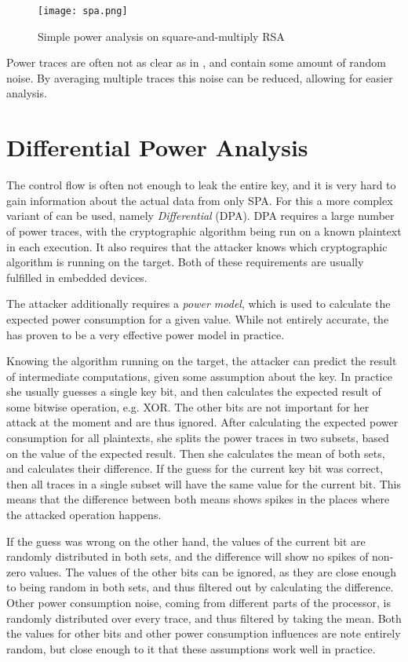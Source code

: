 \begin{figure}[h]
  \centering
  \texttt{[image: spa.png]}
  \caption{Simple power analysis on square-and-multiply RSA\cite{boehme2017netsec}}
  \label{fig:spa}
\end{figure}

Power traces are often not as clear as in , and contain some amount of random noise.
By averaging multiple traces this noise can be reduced, allowing for easier analysis.

\section{Differential Power Analysis}
The control flow is often not enough to leak the entire key, and it is very hard to gain information about the actual data from only SPA.
For this a more complex variant of \poweranalysis{} can be used, namely \emph{Differential \poweranalysis{}} (DPA).
DPA requires a large number of power traces, with the cryptographic algorithm being run on a known plaintext in each execution.
It also requires that the attacker knows which cryptographic algorithm is running on the target.
Both of these requirements are usually fulfilled in embedded devices.

The attacker additionally requires a \emph{power model}, which is used to calculate the expected power consumption for a given value.
While not entirely accurate\cite{brier2004correlation}, the \hammingw{} has proven to be a very effective power model in practice.

Knowing the algorithm running on the target, the attacker can predict the result of intermediate computations, given some assumption about the key.
In practice she usually guesses a single key bit, and then calculates the expected result of some bitwise operation, e.g. XOR.
The other bits are not important for her attack at the moment and are thus ignored.
After calculating the expected power consumption for all plaintexts, she splits the power traces in two subsets, based on the value of the expected result.
Then she calculates the mean of both sets, and calculates their difference.
If the guess for the current key bit was correct, then all traces in a single subset will have the same value for the current bit.
This means that the difference between both means shows spikes in the places where the attacked operation happens.

If the guess was wrong on the other hand, the values of the current bit are randomly distributed in both sets, and the difference will show no spikes of non-zero values.
The values of the other bits can be ignored, as they are close enough to being random in both sets, and thus filtered out by calculating the difference.
Other power consumption noise, coming from different parts of the processor, is randomly distributed over every trace, and thus filtered by taking the mean.
Both the values for other bits and other power consumption influences are note entirely random, but close enough to it that these assumptions work well in practice.

